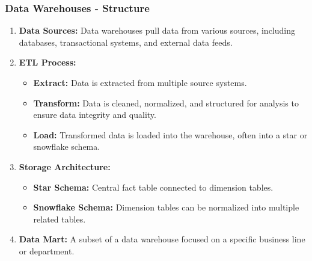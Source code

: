 \documentclass[aspectratio=169]{beamer}
\begin{document}
\begin{frame}[fragile]
    \frametitle{Data Warehouses - Structure}
    \begin{enumerate}
        \item \textbf{Data Sources:} Data warehouses pull data from various sources, including databases, transactional systems, and external data feeds.
        
        \item \textbf{ETL Process:} 
        \begin{itemize}
            \item \textbf{Extract:} Data is extracted from multiple source systems.
            \item \textbf{Transform:} Data is cleaned, normalized, and structured for analysis to ensure data integrity and quality.
            \item \textbf{Load:} Transformed data is loaded into the warehouse, often into a star or snowflake schema.
        \end{itemize}
        
        \item \textbf{Storage Architecture:}
        \begin{itemize}
            \item \textbf{Star Schema:} Central fact table connected to dimension tables.
            \item \textbf{Snowflake Schema:} Dimension tables can be normalized into multiple related tables.
        \end{itemize}

        \item \textbf{Data Mart:} A subset of a data warehouse focused on a specific business line or department.
    \end{enumerate}
\end{frame}
\end{document}
